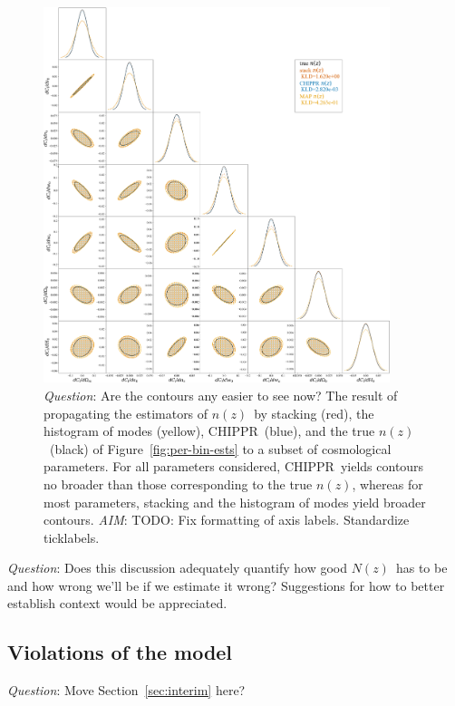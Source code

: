 \documentclass[iop]{emulateapj}
\newcommand{\todo}[3]{{\color{#2}\emph{#1}: #3}}
\newcommand{\aim}[1]{\todo{AIM}{red}{#1}}
\newcommand{\que}[1]{\todo{Question}{cyan}{#1}}
\newcommand{\Sect}[1]{Section~\ref{#1}}
\newcommand{\Fig}[1]{Figure~\ref{#1}}
\newcommand{\project}[1]{\textsc{#1}}
\newcommand{\Chippr}{\project{CHIPPR}}%
\newcommand{\nz}{$n(z)$}
\newcommand{\Nz}{$N(z)$}
\begin{document}
\begin{figure}
	\begin{center}
		\includegraphics[width=0.9\textwidth]{figures/chippr/final_plot.png}
		\caption{
			\que{Are the contours any easier to see now?}
			The result of propagating the estimators of \nz\ by stacking (red), the histogram of modes (yellow), \Chippr\ (blue), and the true \nz\ (black) of \Fig{fig:per-bin-ests} to a subset of cosmological parameters.
			For all parameters considered, \Chippr\ yields contours no broader than those corresponding to the true \nz, whereas for most parameters, stacking and the histogram of modes yield broader contours.
			\aim{TODO: Fix formatting of axis labels.
			Standardize ticklabels.}
		}
		\label{fig:cornerplot}
	\end{center}
\end{figure}

\que{Does this discussion adequately quantify how good \Nz\ has to be and how wrong we'll be if we estimate it wrong?
	Suggestions for how to better establish context would be appreciated.}

\subsection{Violations of the model}
\label{sec:violations}

\que{Move \Sect{sec:interim} here?}
\end{document}
